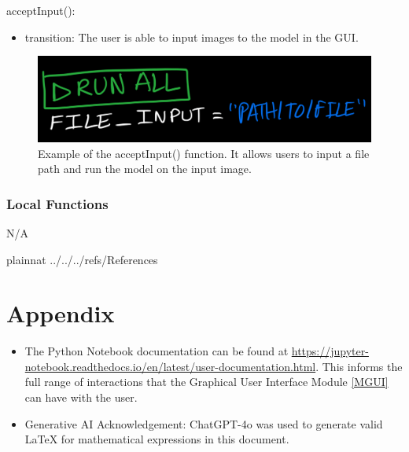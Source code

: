 \documentclass[12pt, titlepage]{article}
\begin{document}
\noindent acceptInput():
\begin{itemize}
\item transition: The user is able to input images to the model in the GUI.
\end{itemize}

\begin{figure}
  \centering
  \includegraphics[width=1\textwidth]{acceptInput.jpeg}
  \caption{Example of the acceptInput() function. It allows users to input a
  file path and run the model on the input image.}
  \label{fig:acceptInput}
  \end{figure}

\subsubsection{Local Functions}

N/A

\newpage

 {plainnat}
 {../../../refs/References}

\newpage

\section{Appendix} \label{Appendix}

\begin{itemize}
  \item The Python Notebook documentation can be found at
  \url{https://jupyter-notebook.readthedocs.io/en/latest/user-documentation.html}.
  This informs the full range of interactions that the Graphical User Interface
  Module \ref{MGUI} can have with the user.
  \item Generative AI Acknowledgement: ChatGPT-4o was used to generate valid
  LaTeX for mathematical expressions in this document.
\end{itemize}

\newpage{}
\end{document}
